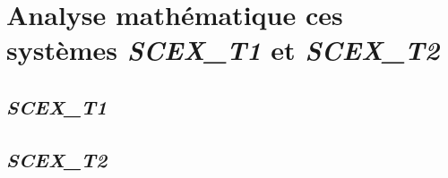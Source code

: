 \section{Analyse mathématique ces systèmes \textit{SCEX\_T1} et \textit{SCEX\_T2}}
\subsection{\textit{SCEX\_T1}}

\subsection{\textit{SCEX\_T2}}